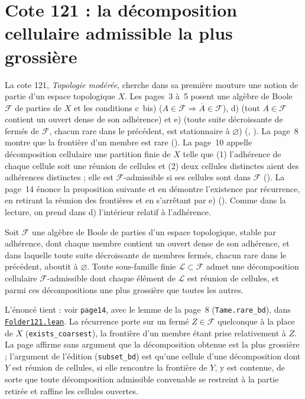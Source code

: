 \section[Cote 121 : la décomposition cellulaire admissible la plus grossière]{Cote 121 : la décomposition cellulaire admissible la plus grossière\protect{}}\label{sec:121}

La cote 121, \emph{Topologie modérée}, cherche dans sa première mouture une notion de partie  d'un espace topologique $X$. Les pages~3 à~5 posent une algèbre de Boole $\mathcal F$ de parties de $X$ et les conditions c~bis) ($A \in \mathcal F \Rightarrow \overline A \in \mathcal F$), d) (tout $A \in \mathcal F$ contient un ouvert dense de son adhérence) et e) (toute suite décroissante de fermés de $\mathcal F$, chacun rare dans le précédent, est stationnaire à $\varnothing$) (, ). La page~8 montre que la frontière d'un membre est rare (). La page~10 appelle décomposition cellulaire une partition finie de $X$ telle que (1) l'adhérence de chaque cellule soit une réunion de cellules et (2) deux cellules distinctes aient des adhérences distinctes ; elle est $\mathcal F$-admissible si ses cellules sont dans $\mathcal F$ (). La page~14 énonce la proposition suivante et en démontre l'existence par récurrence, en retirant la réunion des frontières et en s'arrêtant par e) (). Comme dans la lecture, on prend dans d) l'intérieur relatif à l'adhérence.

\begin{encadre}
\begin{theoreme}
Soit $\mathcal F$ une algèbre de Boole de parties d'un espace topologique, stable par adhérence, dont chaque membre contient un ouvert dense de son adhérence, et dans laquelle toute suite décroissante de membres fermés, chacun rare dans le précédent, aboutit à $\varnothing$. Toute sous-famille finie $\mathcal L \subset \mathcal F$ admet une décomposition cellulaire $\mathcal F$-admissible dont chaque élément de $\mathcal L$ est réunion de cellules, et parmi ces décompositions une plus grossière que toutes les autres.
\end{theoreme}
\end{encadre}

\noindent L'énoncé tient : voir \texttt{page14}, avec le lemme de la page~8 (\texttt{Tame.\allowbreak{}rare\_bd}), dans \href{\leanblob/Topology/Folder121.lean}{\texttt{Folder121.\allowbreak{}lean}}. La récurrence porte sur un fermé $Z \in \mathcal F$ quelconque à la place de $X$ (\texttt{exists\_coarsest}), la frontière d'un membre étant prise relativement à $Z$. La page affirme sans argument que la décomposition obtenue est la plus grossière ; l'argument de l'édition (\texttt{subset\_bd}) est qu'une cellule d'une décomposition dont $Y$ est réunion de cellules, si elle rencontre la frontière de $Y$, y est contenue, de sorte que toute décomposition admissible convenable se restreint à la partie retirée et raffine les cellules ouvertes.

